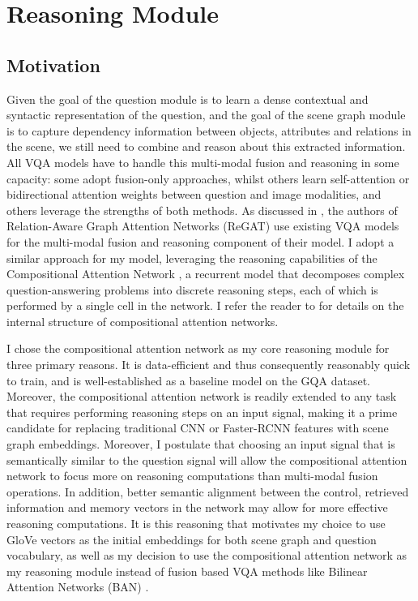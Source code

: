 \section{Reasoning Module}
\label{section:reasoning_module}

\subsection{Motivation}

Given the goal of the question module is to learn a dense contextual and syntactic representation of the question, and the goal of the scene graph module is to capture dependency information between objects, attributes and relations in the scene, we still need to combine and reason about this extracted information. All VQA models have to handle this multi-modal fusion and reasoning in some capacity: some adopt fusion-only approaches, whilst others learn self-attention or bidirectional attention weights between question and image modalities, and others leverage the strengths of both methods. As discussed in \subsectionautorefname{ \ref{subsection:graph_methods_for_vqa}}, the authors of Relation-Aware Graph Attention Networks (ReGAT) use existing VQA models \cite{anderson2018bottom, ben2017mutan, kim2018bilinear} for the multi-modal fusion and reasoning component of their model. I adopt a similar approach for my model, leveraging the reasoning capabilities of the Compositional Attention Network \cite{hudson2018compositional}, a recurrent model that decomposes complex question-answering problems into discrete reasoning steps, each of which is performed by a single cell in the network. I refer the reader to \subsectionautorefname{ \ref{subsection:attention_methods_for_vqa}} for details on the internal structure of compositional attention networks.

I chose the compositional attention network as my core reasoning module for three primary reasons. It is data-efficient and thus consequently reasonably quick to train, and is well-established as a baseline model on the GQA dataset. Moreover, the compositional attention network is readily extended to any task that requires performing reasoning steps on an input signal, making it a prime candidate for replacing traditional CNN or Faster-RCNN \cite{ren2016faster} features with scene graph embeddings. Moreover, I postulate that choosing an input signal that is semantically similar to the question signal will allow the compositional attention network to focus more on reasoning computations than multi-modal fusion operations. In addition, better semantic alignment between the control, retrieved information and memory vectors in the network may allow for more effective reasoning computations. It is this reasoning that motivates my choice to use GloVe vectors \cite{pennington2014glove} as the initial embeddings for both scene graph and question vocabulary, as well as my decision to use the compositional attention network as my reasoning module instead of fusion based VQA methods like Bilinear Attention Networks (BAN) \cite{kim2018bilinear}.

